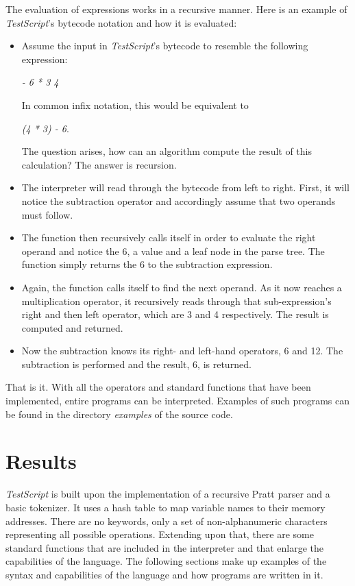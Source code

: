 \documentclass[12pt,a4paper]{article}
\newcommand{\expr}[1] {
    \begin{center}
        #1
    \end{center}
}
\newcommand{\name}{\emph{TestScript}}
\begin{document}
The evaluation of expressions works in a recursive manner. Here is an 
example of \name{}'s bytecode notation and how it is evaluated:
\begin{itemize}
    \item Assume the input in \name{}'s bytecode to resemble the following expression: 
        \expr{\emph{- 6 * 3 4}}
        In common infix notation, this would be equivalent to 
        \expr{\emph{(4 * 3) - 6}.}
        The question arises, how can an algorithm compute the result of this
        calculation? The answer is recursion.
    \item The interpreter will read through the bytecode from left to right. First, it will
        notice the subtraction operator and accordingly assume that two
        operands must follow.
    \item The function then recursively calls itself in order to evaluate the
        right operand and notice the 6, a value and a leaf node in the parse tree. 
        The function simply returns the 6 to the subtraction expression.
    \item Again, the function calls itself to find the next operand.
        As it now reaches a multiplication operator,
        it recursively reads through that sub-expression's right and then left
        operator, which are 3 and 4 respectively.
        The result is computed and returned.
    \item Now the subtraction knows its right- and left-hand operators, 6 and 12.
        The subtraction is performed and the result, 6, is returned.
\end{itemize}

That is it. With all the operators and standard functions that have been implemented, entire programs
can be interpreted. Examples of such programs can be found in the directory
\emph{examples} of the source code.

\section{Results}

\name{} is built upon the implementation of a recursive Pratt
parser and a basic tokenizer. It uses a hash table to map variable names to their
memory addresses. There are no keywords, only a set of non-alphanumeric characters
representing all possible operations. Extending upon that, there are some
standard functions that are included in the interpreter and that enlarge the capabilities of the language.
The following sections make up examples of the syntax and capabilities of the language and
how programs are written in it.
\end{document}
